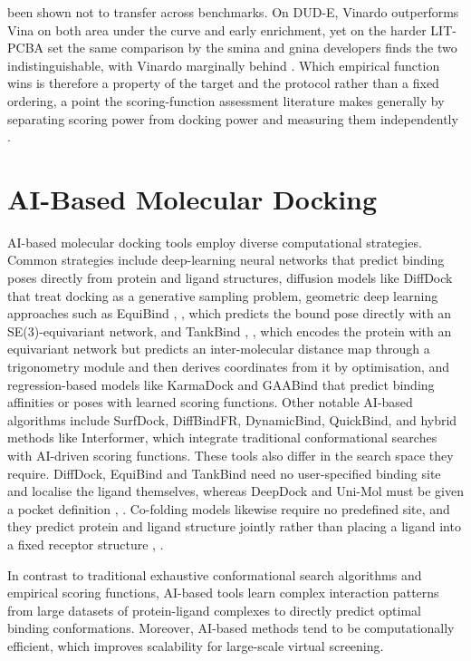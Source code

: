 been shown not to transfer across benchmarks. On DUD-E, Vinardo outperforms Vina on both area under the curve and early enrichment, yet on the harder LIT-PCBA set the same comparison by the smina and gnina developers finds the two indistinguishable, with Vinardo marginally behind \cite{ref083}. Which empirical function wins is therefore a property of the target and the protocol rather than a fixed ordering, a point the scoring-function assessment literature makes generally by separating scoring power from docking power and measuring them independently \cite{ref084}.

\hypertarget{ai-based-molecular-docking-1}{%
\section{AI-Based Molecular Docking}\label{ai-based-molecular-docking-1}}

AI-based molecular docking tools employ diverse computational strategies. Common strategies include deep-learning neural networks that predict binding poses directly from protein and ligand structures, diffusion models like DiffDock \cite{ref024} that treat docking as a generative sampling problem, geometric deep learning approaches such as EquiBind \cite{ref009}, \cite{ref010}, which predicts the bound pose directly with an SE(3)-equivariant network, and TankBind \cite{ref025}, \cite{ref026}, which encodes the protein with an equivariant network but predicts an inter-molecular distance map through a trigonometry module and then derives coordinates from it by optimisation, and regression-based models like KarmaDock \cite{ref027} and GAABind \cite{ref028} that predict binding affinities or poses with learned scoring functions. Other notable AI-based algorithms include SurfDock, DiffBindFR, DynamicBind, QuickBind, and hybrid methods like Interformer, which integrate traditional conformational searches with AI-driven scoring functions. These tools also differ in the search space they require. DiffDock, EquiBind and TankBind need no user-specified binding site and localise the ligand themselves, whereas DeepDock and Uni-Mol must be given a pocket definition \cite{ref012}, \cite{ref035}. Co-folding models likewise require no predefined site, and they predict protein and ligand structure jointly rather than placing a ligand into a fixed receptor structure \cite{ref012}, \cite{ref029}.

In contrast to traditional exhaustive conformational search algorithms and empirical scoring functions, AI-based tools learn complex interaction patterns from large datasets of protein-ligand complexes to directly predict optimal binding conformations. Moreover, AI-based methods tend to be computationally efficient, which improves scalability for large-scale virtual screening.

